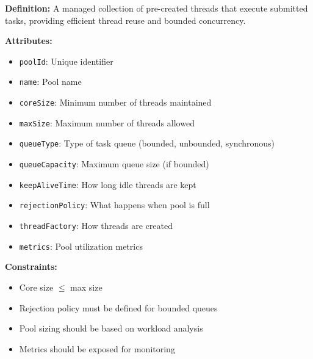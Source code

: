 \documentclass[11pt,letterpaper]{article}
\begin{document}
\begin{definitionbox}
\textbf{Definition:} A managed collection of pre-created threads that execute submitted tasks, providing efficient thread reuse and bounded concurrency.

\textbf{Attributes:}
\begin{itemize}[nosep]
    \item \texttt{poolId}: Unique identifier
    \item \texttt{name}: Pool name
    \item \texttt{coreSize}: Minimum number of threads maintained
    \item \texttt{maxSize}: Maximum number of threads allowed
    \item \texttt{queueType}: Type of task queue (bounded, unbounded, synchronous)
    \item \texttt{queueCapacity}: Maximum queue size (if bounded)
    \item \texttt{keepAliveTime}: How long idle threads are kept
    \item \texttt{rejectionPolicy}: What happens when pool is full
    \item \texttt{threadFactory}: How threads are created
    \item \texttt{metrics}: Pool utilization metrics
\end{itemize}

\textbf{Constraints:}
\begin{itemize}[nosep]
    \item Core size $\leq$ max size
    \item Rejection policy must be defined for bounded queues
    \item Pool sizing should be based on workload analysis
    \item Metrics should be exposed for monitoring
\end{itemize}
\end{definitionbox}
\end{document}
